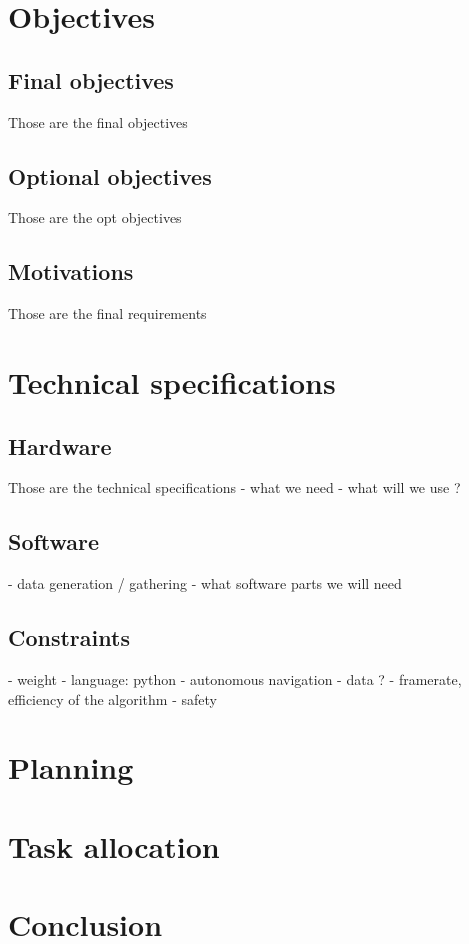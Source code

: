 \documentclass[12pt]{article}
\begin{document}
\section{Objectives}

\subsection{Final objectives}
Those are the final objectives

\subsection{Optional objectives}
Those are the opt objectives

\subsection{Motivations}
Those are the final requirements

\section{Technical specifications}

\subsection{Hardware}
Those are the technical specifications
- what we need
- what will we use ?


\subsection{Software}
- data generation / gathering
- what software parts we will need

\subsection{Constraints}
- weight
- language: python
- autonomous navigation
- data ?
- framerate, efficiency of the algorithm
- safety

\section {Planning}

\section {Task allocation}

\section {Conclusion}
\end{document}
